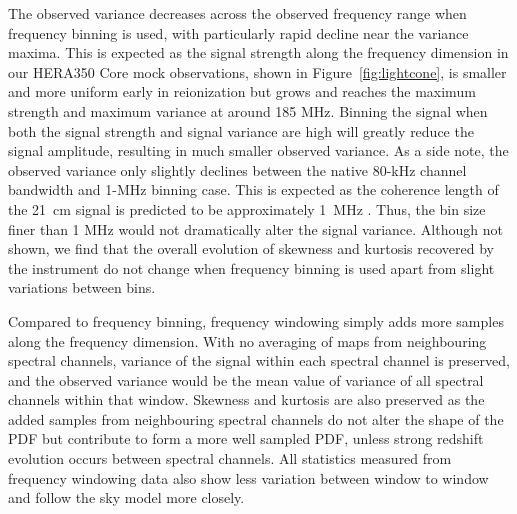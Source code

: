 \documentclass[fleqn,usenatbib]{mnras}
\begin{document}
The observed variance decreases across the observed frequency range when frequency binning is used, with particularly rapid decline near the variance maxima. This is expected as the signal strength along the frequency dimension in our HERA350 Core mock observations, shown in Figure~\ref{fig:lightcone}, is smaller and more uniform early in reionization but grows and reaches the maximum strength and maximum variance at around 185 MHz. Binning the signal when both the signal strength and signal variance are high will greatly reduce the signal amplitude, resulting in much smaller observed variance. As a side note, the observed variance only slightly declines between the native 80-kHz channel bandwidth and 1-MHz binning case. This is expected as the coherence length of the 21~cm signal is predicted to be approximately 1~MHz \citep{2005ApJ...625..575S}. Thus, the bin size finer than 1 MHz would not dramatically alter the signal variance. Although not shown, we find that the overall evolution of skewness and kurtosis recovered by the instrument do not change when frequency binning is used apart from slight variations between bins.

Compared to frequency binning, frequency windowing simply adds more samples along the frequency dimension. With no averaging of maps from neighbouring spectral channels, variance of the signal within each spectral channel is preserved, and the observed variance would be the mean value of variance of all spectral channels within that window. Skewness and kurtosis are also preserved as the added samples from neighbouring spectral channels do not alter the shape of the PDF but contribute to form a more well sampled PDF, unless strong redshift evolution occurs between spectral channels. All statistics measured from frequency windowing data also show less variation between window to window and follow the sky model more closely.
\end{document}
